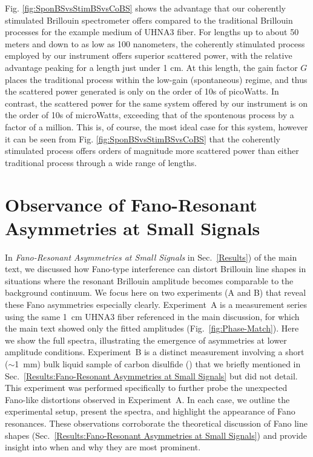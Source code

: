 Fig. \ref{fig:SponBSvsStimBSvsCoBS} shows the advantage that our coherently stimulated Brillouin spectrometer offers compared to the traditional Brillouin processes for the example medium of UHNA3 fiber. For lengths up to about 50 meters and down to as low as 100 nanometers, the coherently stimulated process employed by our instrument offers superior scattered power, with the relative advantage peaking for a length just under 1 cm. At this length, the gain factor $G$ places the traditional process within the low-gain (spontaneous) regime, and thus the scattered power generated is only on the order of 10s of picoWatts. In contrast, the scattered power for the same system offered by our instrument is on the order of 10s of microWatts, exceeding that of the spontenous process by a factor of a million. This is, of course, the most ideal case for this system, however it can be seen from Fig. \ref{fig:SponBSvsStimBSvsCoBS} that the coherently stimulated process offers orders of magnitude more scattered power than either traditional process through a wide range of lengths.

\newpage


\section{Observance of Fano-Resonant Asymmetries at Small Signals}
\label{Appendix:Fano}

In \textit{Fano-Resonant Asymmetries at Small Signals} in Sec.~\ref{Results}) of the main text, we discussed how Fano-type interference can distort Brillouin line shapes in situations where the resonant Brillouin amplitude becomes comparable to the background continuum. We focus here on two experiments (A and B) that reveal these Fano asymmetries especially clearly. Experiment~A is a measurement series using the same \SI{1}{\centi\meter} UHNA3 fiber referenced in the main discussion, for which the main text showed only the fitted amplitudes (Fig.~\ref{fig:Phase-Match}). Here we show the full spectra, illustrating the emergence of asymmetries at lower amplitude conditions. Experiment~B is a distinct measurement involving a short (\(\sim\)\SI{1}{\milli\meter}) bulk liquid sample of carbon disulfide () that we briefly mentioned in Sec.~\ref{Results:Fano-Resonant Asymmetries at Small Signals} but did not detail. This experiment was performed specifically to further probe the unexpected Fano-like distortions observed in Experiment~A. In each case, we outline the experimental setup, present the spectra, and highlight the appearance of Fano resonances. These observations corroborate the theoretical discussion of Fano line shapes (Sec.~\ref{Results:Fano-Resonant Asymmetries at Small Signals}) and provide insight into when and why they are most prominent.

